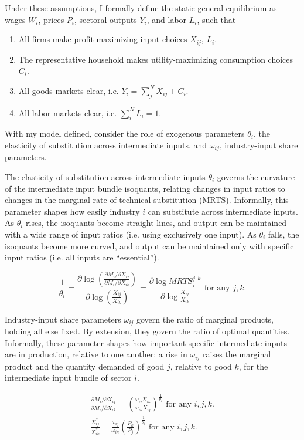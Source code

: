 \documentclass[11pt]{article}
\begin{document}
Under these assumptions, I formally define the static general equilibrium as wages $W_i$, prices $P_i$, sectoral outputs $Y_i$, and labor $L_i$, such that 

\begin{enumerate}
\item All firms make profit-maximizing input choices $X_{ij}$, $L_i$. 
\item The representative household makes utility-maximizing consumption choices $C_i$.
\item All goods markets clear, i.e. $Y_i = \sum_j^N X_{ij} + C_i$.  
\item All labor markets clear, i.e. $\sum_i^N L_i = 1$.
\end{enumerate}

With my model defined, consider the role of exogenous parameters $\theta_i$, the elasticity of substitution across intermediate inputs, and $\omega_{ij}$, industry-input share parameters. 

The elasticity of substitution across intermediate inputs $\theta_i$ governs the curvature of the intermediate input bundle isoquants, relating changes in input ratios to changes in the marginal rate of technical substitution (MRTS). Informally, this parameter shapes how easily industry $i$ can substitute across intermediate inputs. As $\theta_i$ rises, the isoquants become straight lines, and output can be maintained with a wide range of input ratios (i.e. using exclusively one input). As $\theta_i$ falls, the isoquants become more curved, and output can be maintained only with specific input ratios (i.e. all inputs are ``essential'').

\[\frac{1}{\theta_i} = \frac{\partial \log (\frac{\partial M_i/\partial X_{ij}}{\partial M_i/\partial X_{ik}})}{\partial \log (\frac{X_{ij}}{X_{ik}})} = \frac{\partial \log MRTS^{j,k}_i}{\partial \log \frac{X_{ij}}{X_{ik}}} \text{ for any $j,k$.} \]

Industry-input share parameters $\omega_{ij}$ govern the ratio of marginal products, holding all else fixed. By extension, they govern the ratio of optimal quantities. Informally, these parameter shapes how important specific intermediate inputs are in production, relative to one another: a rise in $\omega_{ij}$ raises the marginal product and the quantity demanded of good $j$, relative to good $k$, for the intermediate input bundle of sector $i$.

\[
\begin{aligned}
\frac{\partial M_i/\partial X_{ij}}{\partial M_i/\partial X_{ik}} = \left(\frac{\omega_{ij} X_{ik}}{\omega_{ik} X_{ij}}\right)^{\frac{1}{\theta_i}} \text{ for any $i,j,k$.} \\
\frac{X^*_{ij}}{X^*_{ik}} = \frac{\omega_{ij}}{\omega_{ik}} \left(\frac{P_k}{P_j}\right)^{\frac{1}{\theta_i}} \text{ for any $i,j,k$.}
\end{aligned}
\]
\end{document}
